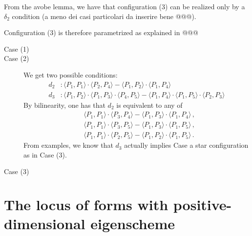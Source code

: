 \documentclass[11pt, a4paper, reqno, captions=tableheading,bibliography=totoc]{scrartcl}
\theoremstyle{plain}
\theoremstyle{definition}
\begin{document}
From the avobe lemma, we have that configuration (3) can be
realized only by a $\delta_2$ condition (a meno dei casi particolari
da inserire bene @@@).

Configuration (3) is therefore parametrized as explained in @@@




\begin{description}
 \item[Case (1)]
 \item[Case (2)]
 We get two possible conditions:
 \begin{align}
  d_2 &: \langle P_1, P_1 \rangle\cdot \langle P_2, P_4\rangle -
  \langle P_1, P_2 \rangle \cdot \langle P_1, P_4 \rangle \label{rango9_1} \\
  d_3 &: \langle P_1,P_2 \rangle \cdot \langle P_1,P_3\rangle \cdot
  \langle P_4,P_5\rangle -\langle P_1,P_4\rangle \cdot \langle P_1,P_5\rangle
  \cdot \langle P_2,P_3\rangle  \label{rango9_2}
\end{align}
By bilinearity, one has that $d_2$ is equivalent to any of
\begin{equation}
\begin{aligned}
    & \langle P_1, P_1 \rangle\cdot \langle P_3, P_4\rangle -
  \langle P_1, P_3 \rangle \cdot \langle P_1, P_4 \rangle \,, \\
    & \langle P_1, P_1 \rangle\cdot \langle P_3, P_5\rangle -
  \langle P_1, P_3 \rangle \cdot \langle P_1, P_5 \rangle \,, \\
    & \langle P_1, P_1 \rangle\cdot \langle P_2, P_5\rangle -
  \langle P_1, P_2 \rangle \cdot \langle P_1, P_5 \rangle \,.
\end{aligned}
\end{equation}
From examples, we know that $d_3$ actually implies Case a star configuration as in Case (3).
 \item[Case (3)]

\end{description}

\section{The locus of forms with positive-dimensional eigenscheme}
\end{document}
